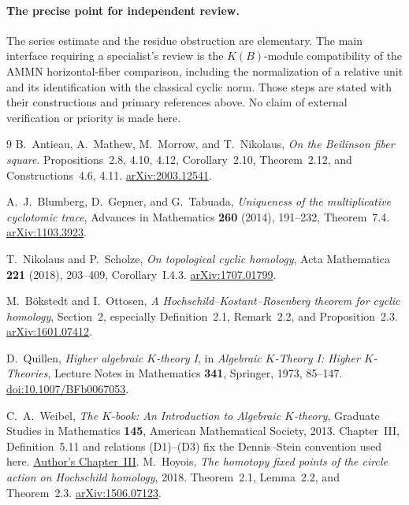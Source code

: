 \documentclass[11pt,a4paper]{article}
\theoremstyle{remark}
\begin{document}
\paragraph{The precise point for independent review.}
The series estimate and the residue obstruction are elementary.
The main interface requiring a specialist's review is the
$K(B)$-module compatibility of the AMMN horizontal-fiber comparison,
including the normalization of a relative unit and its identification
with the classical cyclic norm. Those steps are stated with their
constructions and primary references above. No claim of external
verification or priority is made here.

\begin{thebibliography}{9}
\small
\setlength{\itemsep}{2pt}
B.~Antieau, A.~Mathew, M.~Morrow, and T.~Nikolaus,
\emph{On the Beilinson fiber square}. Propositions~2.8, 4.10, 4.12,
Corollary~2.10, Theorem~2.12, and Constructions~4.6, 4.11.
\href{https://arxiv.org/abs/2003.12541}{arXiv:2003.12541}.

A.~J.~Blumberg, D.~Gepner, and G.~Tabuada,
\emph{Uniqueness of the multiplicative cyclotomic trace},
Advances in Mathematics \textbf{260} (2014), 191--232, Theorem~7.4.
\href{https://arxiv.org/abs/1103.3923}{arXiv:1103.3923}.

T.~Nikolaus and P.~Scholze, \emph{On topological cyclic homology},
Acta Mathematica \textbf{221} (2018), 203--409, Corollary~I.4.3.
\href{https://arxiv.org/abs/1707.01799}{arXiv:1707.01799}.

M.~B\"okstedt and I.~Ottosen,
\emph{A Hochschild--Kostant--Rosenberg theorem for cyclic homology},
Section~2, especially Definition~2.1, Remark~2.2, and Proposition~2.3.
\href{https://arxiv.org/abs/1601.07412}{arXiv:1601.07412}.

D.~Quillen, \emph{Higher algebraic $K$-theory I}, in \emph{Algebraic $K$-Theory I: Higher $K$-Theories}, Lecture Notes in Mathematics \textbf{341}, Springer, 1973, 85--147.
\href{https://doi.org/10.1007/BFb0067053}{doi:10.1007/BFb0067053}.

C.~A.~Weibel, \emph{The $K$-book: An Introduction to Algebraic $K$-theory}, Graduate Studies in Mathematics \textbf{145}, American Mathematical Society, 2013. Chapter~III, Definition~5.11 and relations (D1)--(D3) fix the Dennis--Stein convention used here.
\href{https://sites.math.rutgers.edu/~weibel/Kbook/Kbook.III.pdf}{Author's Chapter~III}.
M.~Hoyois, \emph{The homotopy fixed points of the circle action on
Hochschild homology}, 2018. Theorem~2.1, Lemma~2.2, and Theorem~2.3.
\href{https://arxiv.org/abs/1506.07123}{arXiv:1506.07123}.

\end{thebibliography}
\end{document}
